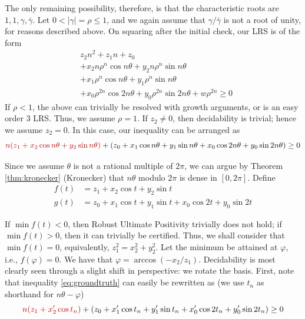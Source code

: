 The only remaining possibility, therefore, is that the characteristic roots are $1, 1, \gamma, \bar{\gamma}$. Let $0 < |\gamma| = \rho \le 1$, and we again assume that $\gamma/\bar{\gamma}$ is not a root of unity, for reasons described above. On squaring after the initial check, our LRS is of the form
\begin{align*}
&z_2n^2 + z_1n + z_0  \\
&+ x_2 n \rho^n \cos n\theta + y_2 n \rho^n \sin n\theta  \\
&+ x_1\rho^n\cos n\theta + y_1\rho^n\sin n\theta  \\
&+ x_0 \rho^{2n}\cos 2n\theta + y_0 \rho^{2n} \sin 2n\theta + w\rho^{2n} \ge 0
\end{align*}
If $\rho < 1$, the above can trivially be resolved with growth arguments, or is an easy order $3$ LRS. Thus, we assume $\rho = 1$. If $z_2 \ne 0$, then decidability is trivial; hence we assume $z_2 = 0$. In this case, our inequality can be arranged as
\begin{equation}
\label{eq:groundtruth}
{\color{red!70!black} n(z_1 + x_2\cos n\theta + y_2\sin n\theta)} + (z_0 + x_1\cos n\theta + y_1\sin n\theta + x_0\cos 2n\theta + y_0\sin 2n\theta) \ge 0
\end{equation}

Since we assume $\theta$ is not a rational multiple of $2\pi$, we can argue by Theorem \ref{thm:kronecker} (Kronecker) that $n\theta$ modulo ${2\pi}$ is dense in $[0, 2\pi]$. Define
\begin{align}
f(t) &= z_1 + x_2\cos t + y_2\sin t \\
g(t) &= z_0 + x_1\cos t + y_1\sin t + x_0\cos 2t + y_0\sin 2t
\end{align}

If $\min f(t) < 0$, then Robust Ultimate Positivity trivially does not hold; if $\min f(t) > 0$, then it can trivially be certified. Thus, we shall consider that $\min f(t) = 0$, equivalently, $z_1^2 = x_2^2 + y_2^2$. Let the minimum be attained at $\varphi$, i.e., $f(\varphi) = 0$. We have that $\varphi = \arccos(-x_2/z_1)$. Decidability is most clearly seen through a slight shift in perspective: we rotate the basis.
First, note that inequality \ref{eq:groundtruth} can easily be rewritten as (we use $t_n$ as shorthand for $n\theta - \varphi$)
\begin{equation}
\label{eq:groundtruthrewrite}
{\color{red!70!black}n(z_1 + x_2' \cos t_n)} + (z_0 + x_1'\cos t_n + y_1'\sin t_n + x_0'\cos 2t_n + y_0'\sin 2t_n) \ge 0
\end{equation}


